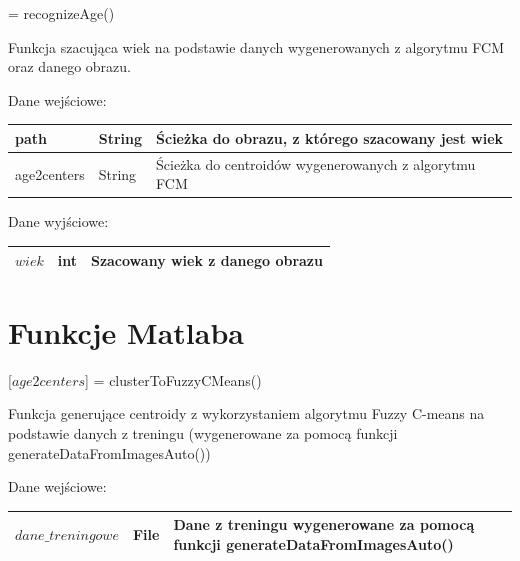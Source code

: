 \documentclass[a4paper,twoside,12pt]{book}
\begin{document}
\begin{appendices}
        \clearpage
        [$wiek$] = recognizeAge()

        \bigskip
        Funkcja szacująca wiek na podstawie danych wygenerowanych z algorytmu FCM oraz danego obrazu.
        \bigskip

        Dane wejściowe:
        \begin{table}[h!]
            \centering
            \begin{tabular}{|p{4cm}|p{4cm}|p{4cm}|}
                \hline
                \multicolumn{1}{|p{4cm}|}{path} & \multicolumn{1}{p{4cm}|}{String} & \multicolumn{1}{p{4cm}|}{Ścieżka do obrazu, z którego szacowany jest wiek} \\ \hline
                age2centers & String & Ścieżka do centroidów wygenerowanych z
                algorytmu FCM                      \\ \hline
            \end{tabular}
        \end{table}


        Dane wyjściowe:
        \begin{table}[h!]
            \centering
            \begin{tabular}{|p{4cm}|p{4cm}|p{4cm}|}
                \hline
                $wiek$ & int & Szacowany wiek z danego obrazu\\ \hline
            \end{tabular}
        \end{table}

        \section*{Funkcje Matlaba}

        [$age2centers$] = clusterToFuzzyCMeans()

        \bigskip
        Funkcja generujące centroidy z wykorzystaniem algorytmu Fuzzy C-means na
        podstawie danych z treningu (wygenerowane za pomocą funkcji generateDataFromImagesAuto())
        \bigskip

        Dane wejściowe:
        \begin{table}[h!]
            \centering
            \begin{tabular}{|p{4cm}|p{4cm}|p{4cm}|}
                \hline
                $dane\_treningowe$ & File & Dane z treningu
                wygenerowane za pomocą funkcji generateDataFromImagesAuto() \\ \hline
            \end{tabular}
        \end{table}


\end{appendices}
\end{document}
